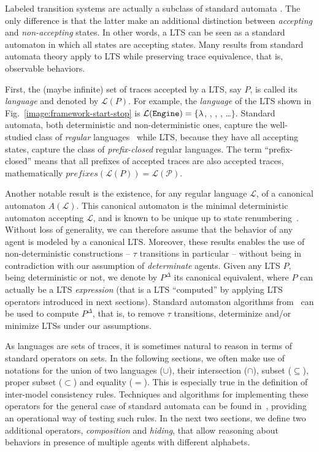 Labeled transition systems are actually a subclass of standard automata \cite{Hopcroft:1979}. The only difference is that the latter make an additional distinction between \emph{accepting} and \emph{non-accepting} states. In other words, a LTS can be seen as a standard automaton in which all states are accepting states. Many results from standard automata theory apply to LTS while preserving trace equivalence, that is, observable behaviors.

First, the (maybe infinite) set of traces accepted by a LTS, say $P$, is called its \emph{language} and denoted by $\mathcal{L}(P)$. For example, the  \emph{language} of the LTS shown in Fig.~\ref{image:framework-start-stop} is $\mathcal{L}(\texttt{Engine})=\{\lambda$, , , , \ldots $\}$. Standard automata, both deterministic and non-deterministic ones, capture the well-studied class of \emph{regular} languages~\cite{Hopcroft:1979} while LTS, because they have all accepting states, capture the class of \emph{prefix-closed} regular languages. The term ``prefix-closed'' means that all prefixes of accepted traces are also accepted traces, mathematically $prefixes(\mathcal{L}(P)) = \mathcal{L(P)}$.

Another notable result is the existence, for any regular language $\mathcal{L}$, of a canonical automaton $A(\mathcal{L})$. This canonical automaton is the minimal deterministic automaton accepting $\mathcal{L}$, and is known to be unique up to state renumbering~\cite{Gold:1978}. Without loss of generality, we can therefore assume that the behavior of any agent is modeled by a canonical LTS. Moreover, these results enables the use of non-deterministic constructions -- $\tau$ transitions in particular -- without being in contradiction with our assumption of \emph{determinate} agents. Given any LTS $P$, being deterministic or not, we denote by $P^{\Delta}$ its canonical equivalent, where $P$ can actually be a LTS \emph{expression} (that is a LTS ``computed'' by applying LTS operators introduced in next sections). Standard automaton algorithms from~\cite{Hopcroft:1979} can be used to compute $P^\Delta$, that is, to remove $\tau$ transitions, determinize and/or minimize LTSs under our assumptions.

As languages are sets of traces, it is sometimes natural to reason in terms of standard operators on sets. In the following sections, we often make use of notations for the union of two languages ($\cup$), their intersection ($\cap$), subset ($\subseteq$), proper subset ($\subset$) and equality ($=$). This is especially true in the definition of inter-model consistency rules. Techniques and algorithms for implementing these operators for the general case of standard automata can be found in~\cite{Hopcroft:1979, Aho:1986}, providing an operational way of testing such rules. In the next two sections, we define two additional operators, \emph{composition} and \emph{hiding}, that allow reasoning about behaviors in presence of multiple agents with different alphabets.  

